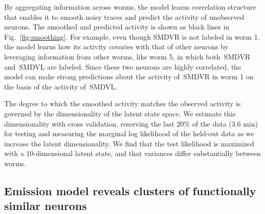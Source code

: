\documentclass[11pt]{article}
\begin{document}
By aggregating information across worms, the model learns correlation
structure that enables it to smooth noisy traces and predict the
activity of unobserved neurons.  The smoothed and predicted activity
is shown as black lines in Fig.~\ref{fig:smoothing}. For example,
even though \textsf{SMDVR} is not labeled in worm 1, the model
learns how its activity covaries with that of other neurons
by leveraging information from other worms, like worm 5, in which
both~\textsf{SMDVR} and~\textsf{SMDVL} are labeled.  Since these
two neurons are highly correlated, the model can make strong predictions
about the activity of~\textsf{SMDVR} in worm 1 on the basis of the
activity of~\textsf{SMDVL}.

The degree to which the smoothed activity matches the observed
activity is governed by the dimensionality of the latent state space.
We estimate this dimensionality with cross validation, reserving the
last 20\% of the data (3.6 min) for testing and measuring the marginal
log likelihood of the held-out data as we increase the latent
dimensionality. We find that the test likelihood is maximized with a
10-dimensional latent state, and that variances differ substantially
between worms. 

 
\subsection*{Emission model reveals clusters of functionally similar neurons}
\end{document}
